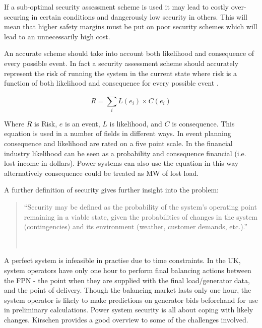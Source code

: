 \documentclass[a4paper,oneside,12pt]{report}
\newcommand{\tmpquotecite}{}%
\newenvironment{myquote}[1][]
{\renewcommand{\tmpquotecite}{#1}\begin{quote}\begin{itshape}``}
{''\end{itshape}~{\normalfont~\tmpquotecite}\end{quote}}
\newenvironment{vivacorrections}
{}
{}
\begin{document}
If a sub-optimal security assessment scheme is used it may lead to costly over-securing in certain conditions and dangerously low security in others. This will mean that higher safety margins must be put on poor security schemes which will lead to an unnecessarily high cost.

An accurate scheme should take into account both likelihood and consequence of every possible event. In fact a security assessment scheme should accurately represent the risk of running the system in the current state where risk is a function of both likelihood and consequence for every possible event \cite{Billinton1997}.

\begin{equation}
  \label{eqn_risk}
  R = \sum\limits_{i}^{} L (e_i) \times C(e_i)
\end{equation}

\begin{vivacorrections}

Where $R$ is Risk, $e$ is an event, $L$ is likelihood, and $C$ is consequence. This equation is used in a number of fields in different ways. In event planning consequence and likelihood are rated on a five point scale. In the financial industry likelihood can be seen as a probability and consequence financial (i.e. lost income in dollars). Power systems can also use the equation in this way alternatively consequence could be treated as MW of lost load.

\end{vivacorrections}


A further definition of security \cite{Balu1992} gives further insight into the problem:

\begin{myquote}[\cite{Balu1992}]Security may be defined as the probability of the system's operating point remaining in a viable state, given the probabilities of changes in the system (contingencies) and its environment (weather, customer demands, etc.).\end{myquote}

A perfect system is infeasible in practise due to time constraints. In the UK, system operators have only one hour to perform final balancing actions between the FPN - the point when they are supplied with the final load/generator data, and the point of delivery. Though the balancing market lasts only one hour, the system operator is likely to make predictions on generator bids beforehand for use in preliminary calculations. Power system security is all about coping with likely changes. Kirschen \cite{Kirschen2002} provides a good overview to some of the challenges involved.
\end{document}
